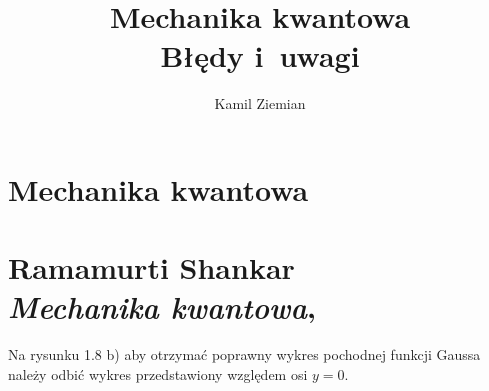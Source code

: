 \documentclass[a4paper,11pt]{article}
\title{Mechanika kwantowa \\
  {\Large Błędy i~uwagi}}
\author{Kamil Ziemian}
\numberwithin{equation}{section}
\begin{document}





\maketitle %





\section{Mechanika kwantowa}

\VerSpaceTwo



\section{Ramamurti Shankar \\
  \textit{Mechanika kwantowa},
  \parencite{ShankarMechanikaKwantowa2006}}


\vspace{0em}



\vspace{0em}


\noindent
{} Na rysunku 1.8 b) aby otrzymać poprawny wykres
pochodnej funkcji Gaussa należy odbić wykres przedstawiony względem osi
$y = 0$.

\VerSpaceFour









\newpage

\end{document}
